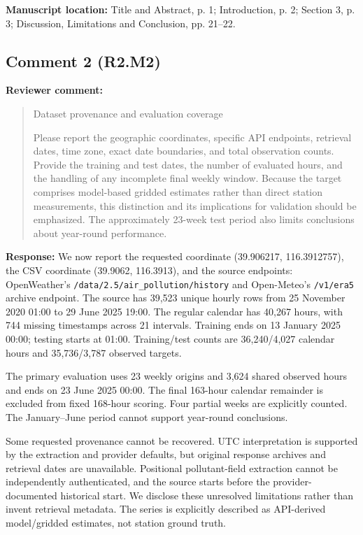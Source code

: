 \documentclass[11pt,a4paper]{article}
\begin{document}
\textbf{Manuscript location:} Title and Abstract, p. 1; Introduction, p. 2; Section 3, p. 3; Discussion, Limitations and Conclusion, pp. 21--22.
\begin{samepage}
\subsection*{Comment 2 (R2.M2)}
\textbf{Reviewer comment:}
\begin{quote}\small Dataset provenance and evaluation coverage

Please report the geographic coordinates, specific API endpoints, retrieval dates, time zone, exact date boundaries, and total observation counts. Provide the training and test dates, the number of evaluated hours, and the handling of any incomplete final weekly window. Because the target comprises model-based gridded estimates rather than direct station measurements, this distinction and its implications for validation should be emphasized. The approximately 23-week test period also limits conclusions about year-round performance.\end{quote}
\end{samepage}
\textbf{Response:}
We now report the requested coordinate (39.906217, 116.3912757), the CSV coordinate (39.9062, 116.3913), and the source endpoints: OpenWeather's \nolinkurl{/data/2.5/air_pollution/history} and Open-Meteo's \nolinkurl{/v1/era5} archive endpoint. The source has 39,523 unique hourly rows from 25 November 2020 01:00 to 29 June 2025 19:00. The regular calendar has 40,267 hours, with 744 missing timestamps across 21 intervals. Training ends on 13 January 2025 00:00; testing starts at 01:00. Training/test counts are 36,240/4,027 calendar hours and 35,736/3,787 observed targets.

The primary evaluation uses 23 weekly origins and 3,624 shared observed hours and ends on 23 June 2025 00:00. The final 163-hour calendar remainder is excluded from fixed 168-hour scoring. Four partial weeks are explicitly counted. The January--June period cannot support year-round conclusions.

Some requested provenance cannot be recovered. UTC interpretation is supported by the extraction and provider defaults, but original response archives and retrieval dates are unavailable. Positional pollutant-field extraction cannot be independently authenticated, and the source starts before the provider-documented historical start. We disclose these unresolved limitations rather than invent retrieval metadata. The series is explicitly described as API-derived model/gridded estimates, not station ground truth.
\end{document}
